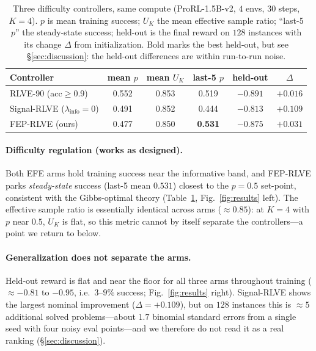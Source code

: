 \documentclass{article}
\newcommand{\UK}{U_{K}}
\begin{document}
\begin{table}[t]
\centering
\caption{Three difficulty controllers, same compute (ProRL-1.5B-v2, $4$ envs,
$30$ steps, $K{=}4$). $p$ is mean training success; $\UK$ the mean effective
sample ratio; ``last-5 $p$'' the steady-state success; held-out is the final
reward on $128$ instances with its change $\Delta$ from initialization. Bold marks
the best held-out, but see \S\ref{sec:discussion}: the held-out differences are
within run-to-run noise.}
\label{tab:main}
\begin{tabular}{lccccc}
\toprule
Controller & mean $p$ & mean $\UK$ & last-5 $p$ & held-out & $\Delta$ \\
\midrule
RLVE-90 (acc$\ge$0.9) & 0.552 & 0.853 & 0.519 & $-0.891$ & $+0.016$ \\
Signal-RLVE ($\lambda_{\mathrm{info}}{=}0$) & 0.491 & 0.852 & 0.444 & $\mathbf{-0.813}$ & $\mathbf{+0.109}$ \\
FEP-RLVE (ours) & 0.477 & 0.850 & \textbf{0.531} & $-0.875$ & $+0.031$ \\
\bottomrule
\end{tabular}
\end{table}

\paragraph{Difficulty regulation (works as designed).}
Both EFE arms hold training success near the informative band, and FEP-RLVE parks
\emph{steady-state} success (last-5 mean $0.531$) closest to the $p{=}0.5$
set-point, consistent with the Gibbs-optimal theory (Table~\ref{tab:main},
Fig.~\ref{fig:results} left). The effective sample ratio is essentially identical
across arms ($\approx0.85$): at $K{=}4$ with $p$ near $0.5$, $\UK$ is flat, so this
metric cannot by itself separate the controllers---a point we return to below.

\paragraph{Generalization does not separate the arms.}
Held-out reward is flat and near the floor for all three arms throughout training
($\approx-0.81$ to $-0.95$, i.e.\ $3$--$9\%$ success; Fig.~\ref{fig:results}
right). Signal-RLVE shows the largest nominal improvement ($\Delta{=}+0.109$),
but on $128$ instances this is $\approx5$ additional solved problems---about
$1.7$ binomial standard errors from a single seed with four noisy eval points---and
we therefore do not read it as a real ranking (\S\ref{sec:discussion}).
\end{document}

